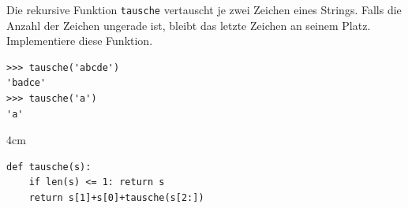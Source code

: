 \question[3]
Die rekursive Funktion \texttt{tausche} vertauscht je zwei
Zeichen eines Strings. Falls die Anzahl der Zeichen
ungerade ist, bleibt das letzte Zeichen an seinem Platz.
Implementiere diese Funktion.
\begin{lstlisting}
>>> tausche('abcde')
'badce'
>>> tausche('a')
'a'
\end{lstlisting}
\begin{solutionbox}{4cm}
\begin{lstlisting}
def tausche(s):
    if len(s) <= 1: return s
    return s[1]+s[0]+tausche(s[2:])
\end{lstlisting}
\end{solutionbox}
